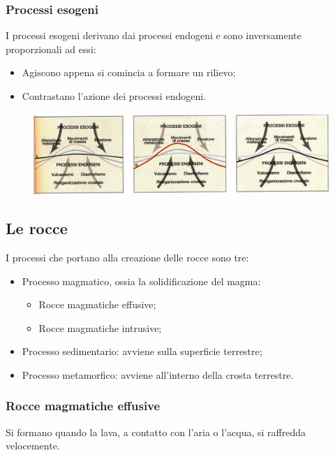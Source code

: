 \documentclass{article}
\begin{document}
\subsubsection{Processi esogeni}
I processi esogeni derivano dai processi endogeni e sono inversamente proporzionali ad essi:
\begin{itemize}
    \item Agiscono appena si comincia a formare un rilievo;
    \item Contrastano l'azione dei processi endogeni.
\end{itemize}
\vspace*{.3cm}
\begin{figure}[ht!]
    \begin{center}
        \includegraphics[width=\textwidth]{media/geo_fisica/processi_geo.png}
    \end{center}
\end{figure}
\phantom{}

\subsection{Le rocce}
I processi che portano alla creazione delle rocce sono tre:
\begin{itemize}
    \item Processo magmatico, ossia la solidificazione del magma:
    \begin{itemize}
        \item Rocce magmatiche effusive;
        \item Rocce magmatiche intrusive;
    \end{itemize}
    \item Processo sedimentario: avviene sulla superficie terrestre;
    \item Processo metamorfico: avviene all'interno della crosta terrestre.
\end{itemize}

\subsubsection{Rocce magmatiche effusive}
Si formano quando la lava, a contatto con l'aria o l'acqua, si raffredda velocemente.
\end{document}
